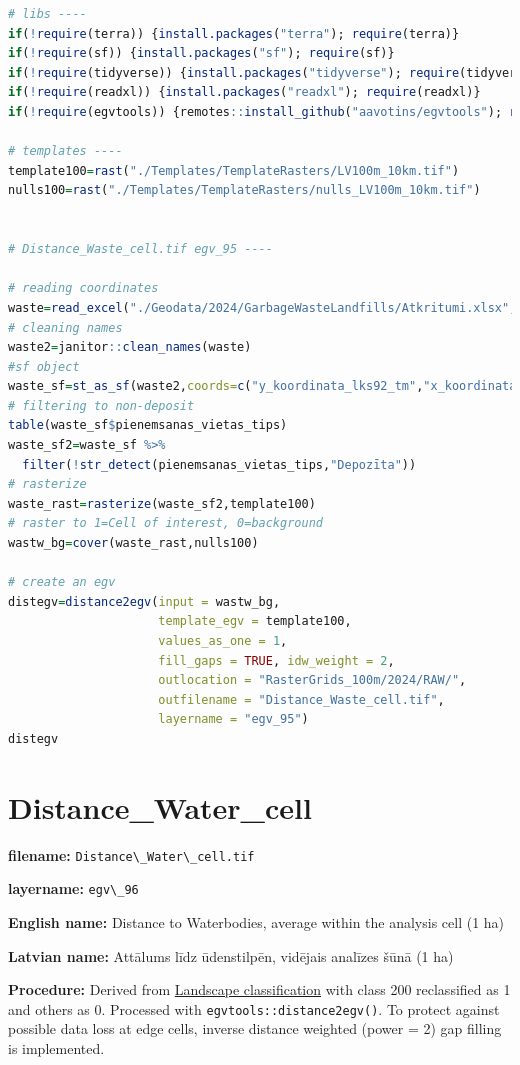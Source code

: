 \documentclass[
]{book}
\newcommand{\passthrough}[1]{#1}
\begin{document}
\begin{lstlisting}[language=R]
# libs ----
if(!require(terra)) {install.packages("terra"); require(terra)}
if(!require(sf)) {install.packages("sf"); require(sf)}
if(!require(tidyverse)) {install.packages("tidyverse"); require(tidyverse)}
if(!require(readxl)) {install.packages("readxl"); require(readxl)}
if(!require(egvtools)) {remotes::install_github("aavotins/egvtools"); require(egvtools)}

# templates ----
template100=rast("./Templates/TemplateRasters/LV100m_10km.tif")
nulls100=rast("./Templates/TemplateRasters/nulls_LV100m_10km.tif")


# Distance_Waste_cell.tif egv_95 ----

# reading coordinates
waste=read_excel("./Geodata/2024/GarbageWasteLandfills/Atkritumi.xlsx",sheet="AtkritumuVietas")
# cleaning names
waste2=janitor::clean_names(waste)
#sf object
waste_sf=st_as_sf(waste2,coords=c("y_koordinata_lks92_tm","x_koordinata_lks92_tm"),crs=3059)
# filtering to non-deposit
table(waste_sf$pienemsanas_vietas_tips)
waste_sf2=waste_sf %>% 
  filter(!str_detect(pienemsanas_vietas_tips,"Depozīta"))
# rasterize
waste_rast=rasterize(waste_sf2,template100)
# raster to 1=Cell of interest, 0=background
wastw_bg=cover(waste_rast,nulls100)

# create an egv
distegv=distance2egv(input = wastw_bg,
                     template_egv = template100,
                     values_as_one = 1,
                     fill_gaps = TRUE, idw_weight = 2,
                     outlocation = "RasterGrids_100m/2024/RAW/",
                     outfilename = "Distance_Waste_cell.tif",
                     layername = "egv_95")
distegv
\end{lstlisting}

\section{Distance\_Water\_cell}\label{ch06.096}

\textbf{filename:} \passthrough{\lstinline!Distance\_Water\_cell.tif!}

\textbf{layername:} \passthrough{\lstinline!egv\_96!}

\textbf{English name:} Distance to Waterbodies, average within the analysis cell (1 ha)

\textbf{Latvian name:} Attālums līdz ūdenstilpēn, vidējais analīzes šūnā (1 ha)

\textbf{Procedure:} Derived from \hyperref[Ch05.03]{Landscape classification} with class 200
reclassified as 1 and others as 0. Processed with \passthrough{\lstinline!egvtools::distance2egv()!}.
To protect against possible data loss at edge cells, inverse distance
weighted (power = 2) gap filling is implemented.
\end{document}
